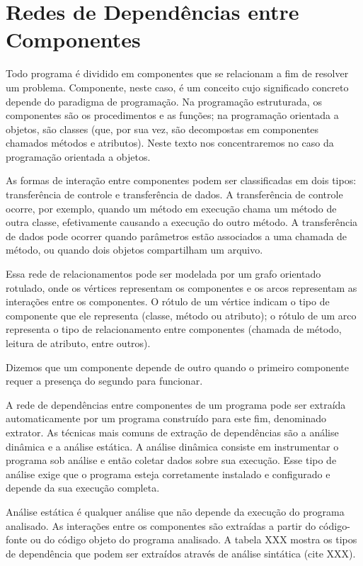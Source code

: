 \documentclass{article}
\begin{document}
\section{Redes de Dependências entre Componentes}

Todo programa é dividido em componentes que se relacionam a fim de resolver um problema. Componente, neste caso, é um conceito cujo significado concreto depende do paradigma de programação. Na programação estruturada, os componentes são os procedimentos e as funções; na programação orientada a objetos, são classes (que, por sua vez, são decompostas em componentes chamados métodos e atributos). Neste texto nos concentraremos no caso da programação orientada a objetos.

As formas de interação entre componentes podem ser classificadas em dois tipos: transferência de controle e transferência de dados. A transferência de controle ocorre, por exemplo, quando um método em execução chama um método de outra classe, efetivamente causando a execução do outro método. A transferência de dados pode ocorrer quando parâmetros estão associados a uma chamada de método, ou quando dois objetos compartilham um arquivo.

Essa rede de relacionamentos pode ser modelada por um grafo orientado rotulado, onde os vértices representam os componentes e os arcos representam as interações entre os componentes. O rótulo de um vértice indicam o tipo de componente que ele representa (classe, método ou atributo); o rótulo de um arco representa o tipo de relacionamento entre componentes (chamada de método, leitura de atributo, entre outros).

Dizemos que um componente depende de outro quando o primeiro componente requer a presença do segundo para funcionar.

A rede de dependências entre componentes de um programa pode ser extraída automaticamente por um programa construído para este fim, denominado extrator. As técnicas mais comuns de extração de dependências são a análise dinâmica e a análise estática. A análise dinâmica consiste em instrumentar o programa sob análise e então coletar dados sobre sua execução. Esse tipo de análise exige que o programa esteja corretamente instalado e configurado e depende da sua execução completa.

Análise estática é qualquer análise que não depende da execução do programa analisado. As interações entre os componentes são extraídas a partir do código-fonte ou do código objeto do programa analisado. A tabela XXX mostra os tipos de dependência que podem ser extraídos através de análise sintática (cite XXX).
\end{document}
